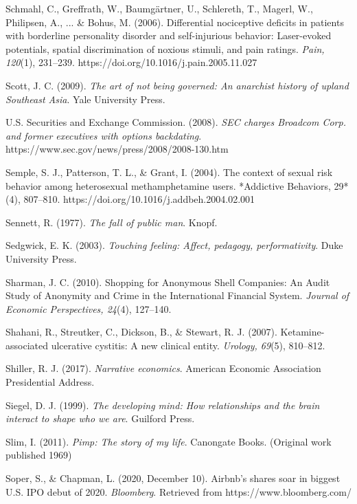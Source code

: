 \begin{thebibliography}{}
    Schmahl, C., Greffrath, W., Baumgärtner, U., Schlereth, T., Magerl, W., Philipsen, A., ... \& Bohus, M. (2006). Differential nociceptive deficits in patients with borderline personality disorder and self-injurious behavior: Laser-evoked potentials, spatial discrimination of noxious stimuli, and pain ratings. \textit{Pain, 120}(1), 231–239. https://doi.org/10.1016/j.pain.2005.11.027

    Scott, J. C. (2009). \textit{The art of not being governed: An anarchist history of upland Southeast Asia}. Yale University Press.
    
    U.S. Securities and Exchange Commission. (2008). \textit{SEC charges Broadcom Corp. and former executives with options backdating}. https://www.sec.gov/news/press/2008/2008-130.htm

    Semple, S. J., Patterson, T. L., \& Grant, I. (2004). The context of sexual risk behavior among heterosexual methamphetamine users. *Addictive Behaviors, 29*(4), 807–810. https://doi.org/10.1016/j.addbeh.2004.02.001

    Sennett, R. (1977). \textit{The fall of public man}. Knopf.

    Sedgwick, E. K. (2003). \textit{Touching feeling: Affect, pedagogy, performativity}. Duke University Press.

    Sharman, J. C. (2010). Shopping for Anonymous Shell Companies: An Audit Study of Anonymity and Crime in the International Financial System. \textit{Journal of Economic Perspectives, 24}(4), 127–140.

    Shahani, R., Streutker, C., Dickson, B., \& Stewart, R. J. (2007). Ketamine-associated ulcerative cystitis: A new clinical entity. \textit{Urology, 69}(5), 810–812.

    Shiller, R. J. (2017). \textit{Narrative economics}. American Economic Association Presidential Address.

    Siegel, D. J. (1999). \textit{The developing mind: How relationships and the brain interact to shape who we are}. Guilford Press.

    Slim, I. (2011). \textit{Pimp: The story of my life}. Canongate Books. (Original work published 1969)

    Soper, S., \& Chapman, L. (2020, December 10). Airbnb’s shares soar in biggest U.S. IPO debut of 2020. \textit{Bloomberg}. Retrieved from https://www.bloomberg.com/


\end{thebibliography}
